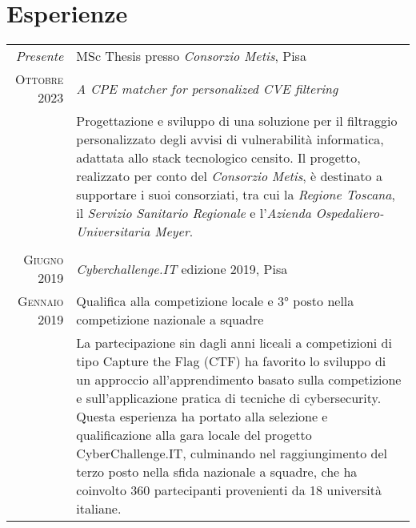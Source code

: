 \documentclass[a4paper,11pt]{article} %
\begin{document}
\section{Esperienze}

\begin{tabular}{r|p{11cm}}
\emph{Presente} & MSc Thesis presso \emph{Consorzio Metis}, Pisa\\
\textsc{Ottobre 2023} & \emph{A CPE matcher for personalized CVE filtering}\\ 
& \footnotesize{Progettazione e sviluppo di una soluzione per il filtraggio personalizzato degli avvisi di vulnerabilità informatica, adattata allo stack tecnologico censito. Il progetto, realizzato per conto del \emph{Consorzio Metis}, è destinato a supportare i suoi consorziati, tra cui la \emph{Regione Toscana}, il \emph{Servizio Sanitario Regionale} e l’\emph{Azienda Ospedaliero-Universitaria Meyer}.}\\
\multicolumn{2}{c}{} \\
%
%
\textsc{Giugno 2019} & \emph{Cyberchallenge.IT} edizione 2019, Pisa\\
\textsc{Gennaio 2019} & Qualifica alla competizione locale e 3° posto nella competizione nazionale a squadre\\ 
& \footnotesize{La partecipazione sin dagli anni liceali a competizioni di tipo Capture the Flag (CTF) ha favorito lo sviluppo di un approccio all’apprendimento basato sulla competizione e sull’applicazione pratica di tecniche di cybersecurity. Questa esperienza ha portato alla selezione e qualificazione alla gara locale del progetto CyberChallenge.IT, culminando nel raggiungimento del terzo posto nella sfida nazionale a squadre, che ha coinvolto 360 partecipanti provenienti da 18 università italiane.}\\
%
%
%
%
\end{tabular}
\end{document}

